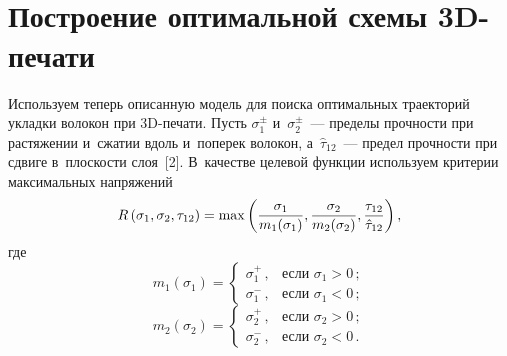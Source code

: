 \begin{multicols}{2}
\setcounter{figure}{1}
\begin{figure*} %
\vspace*{1pt}
  \begin{center}  
    \mbox{%
\epsfxsize=163mm
}

\end{center}
\vspace*{-9pt}
\end{figure*}
\begin{figure*}[b] %
\vspace*{1pt}
  \begin{center}  
    \mbox{%
\epsfxsize=161.879mm
}

\end{center}
\vspace*{-9pt}
\end{figure*}

\section{Построение оптимальной схемы 3D-печати}

  Используем теперь описанную модель для поиска оптимальных траекторий 
уклад\-ки волокон при 3D-пе\-ча\-ти. Пусть $\sigma_1^{\pm}$ и~$\sigma_2^{\pm}$~--- 
пределы проч\-ности при растяжении и~сжатии вдоль и~поперек волокон, 
а~$\hat{\tau}_{12}$~--- предел проч\-ности при сдвиге в~плос\-кости слоя~[2]. 
В~качестве целевой функции используем критерии максимальных на\-пря\-же\-ний 
$$
R\left(\sigma_1, \sigma_2, \tau_{12}\right)= \max\left( \displaystyle\frac{\displaystyle \sigma_1\mathstrut}{\displaystyle m_1(\sigma_1)\mathstrut}, 
\displaystyle\frac{\displaystyle \sigma_2\mathstrut}{\displaystyle m_2(\sigma_2)\mathstrut}, \displaystyle\frac{\displaystyle \tau_{12}\mathstrut}{\displaystyle \hat{\tau}_{12}\mathstrut}\right),
$$ 
где
  $$
  m_1(\sigma_1) =\begin{cases}
  \sigma_1^+\,, &\mbox{если }\sigma_1>0\,;\\
  \sigma_1^-\,, &\mbox{если }\sigma_1<0\,;
  \end{cases}
  $$
  $$
  m_2(\sigma_2) =\begin{cases}
  \sigma_2^+\,, &\mbox{если }\sigma_2>0\,;\\
  \sigma_2^-\,, &\mbox{если }\sigma_2<0\,.
  \end{cases}
  $$
  

\end{multicols}
